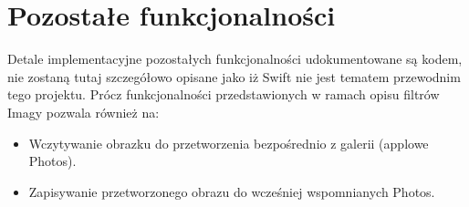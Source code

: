 \documentclass[a4paper]{article}
\begin{document}
\section{Pozostałe funkcjonalności}

Detale implementacyjne pozostałych funkcjonalności udokumentowane są kodem, nie zostaną tutaj szczegółowo opisane jako iż Swift nie jest tematem przewodnim tego projektu. Prócz funkcjonalności przedstawionych w ramach opisu filtrów Imagy pozwala również na:

\begin{itemize}
    \item Wczytywanie obrazku do przetworzenia bezpośrednio z galerii (applowe Photos).
    \item Zapisywanie przetworzonego obrazu do wcześniej wspomnianych Photos.
\end{itemize}
\end{document}
